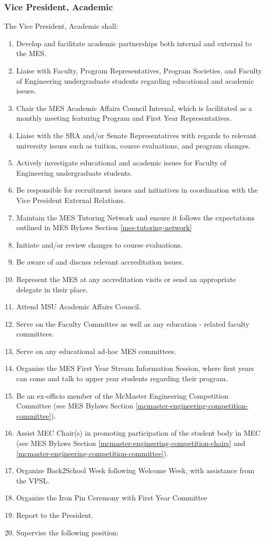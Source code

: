 \subsubsection{Vice President,
 Academic}
\label{vice-president-academic}
The Vice President, Academic shall:

\begin{enumerate}
 \item
  Develop and facilitate academic partnerships both internal and
  external to the MES.
 \item
  Liaise with Faculty, Program Representatives, Program Societies, and
  Faculty of Engineering undergraduate students regarding educational
  and academic issues.
 \item
  Chair the MES Academic Affairs Council Internal, which is facilitated
  as a monthly meeting featuring Program and First Year Representatives.
 \item
  Liaise with the SRA and/or Senate Representatives with regards to
  relevant university issues such as tuition, course evaluations, and
  program changes.
 \item
  Actively investigate educational and academic issues for Faculty of
  Engineering undergraduate students.
 \item
  Be responsible for recruitment issues and initiatives in coordination
  with the Vice President External Relations.
 \item
  Maintain the MES Tutoring Network and ensure it follows the
  expectations outlined in MES Bylaws Section \ref{mes-tutoring-network}
 \item
  Initiate and/or review changes to course evaluations.
 \item
  Be aware of and discuss relevant accreditation issues.
 \item
  Represent the MES at any accreditation visits or send an appropriate
  delegate in their place.
 \item
  Attend MSU Academic Affairs Council.
 \item
  Serve on the Faculty Committee as well as any education - related
  faculty committees.
 \item
  Serve on any educational ad-hoc MES committees.
 \item
  Organize the MES First Year Stream Information Session, where first
  years can come and talk to upper year students regarding their
  program.
 \item
  Be an ex-officio member of the McMaster Engineering Competition
  Committee (see MES Bylaws Section
  \ref{mcmaster-engineering-competition-committee}).
 \item
  Assist MEC Chair(s) in promoting participation of the student body in
  MEC (see MES Bylaws Section
  \ref{mcmaster-engineering-competition-chairs} and
  \ref{mcmaster-engineering-competition-committee}).
 \item
  Organize Back2School Week following Welcome Week, with assistance from
  the VPSL.
 \item
  Organize the Iron Pin Ceremony with First Year Committee
 \item
  Report to the President.
 \item
  Supervise the following position:


\end{enumerate}
